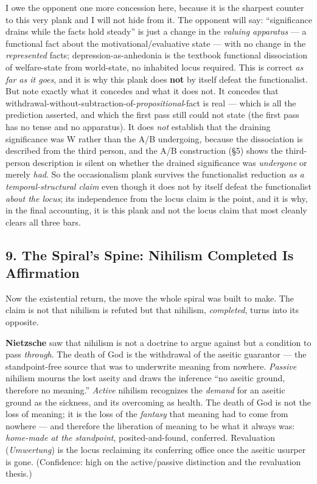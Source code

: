 \documentclass[11pt]{article}
\begin{document}
I owe the opponent one more concession here, because it is the sharpest counter to this very plank and I will not hide from it. The opponent will say: ``significance drains while the facts hold steady'' is just a change in the \emph{valuing apparatus} — a functional fact about the motivational/\allowbreak{}evaluative state — with no change in the \emph{represented} facts; depression-as-anhedonia is the textbook functional dissociation of welfare-state from world-state, no inhabited locus required. This is correct \emph{as far as it goes}, and it is why this plank does \textbf{not} by itself defeat the functionalist. But note exactly what it concedes and what it does not. It concedes that withdrawal-without-subtraction-of-\emph{propositional}-fact is real — which is all the prediction asserted, and which the first pass still could not state (the first pass has no tense and no apparatus). It does \emph{not} establish that the draining significance was W rather than the A/\allowbreak{}B undergoing, because the dissociation is described from the third person, and the A/\allowbreak{}B construction (§5) shows the third-person description is silent on whether the drained significance was \emph{undergone} or merely \emph{had}. So the occasionalism plank survives the functionalist reduction \emph{as a temporal-structural claim} even though it does not by itself defeat the functionalist \emph{about the locus}; its independence from the locus claim is the point, and it is why, in the final accounting, it is this plank and not the locus claim that most cleanly clears all three bars.

\subsection*{9. The Spiral's Spine: Nihilism Completed Is Affirmation}

Now the existential return, the move the whole spiral was built to make. The claim is not that nihilism is refuted but that nihilism, \emph{completed}, turns into its opposite.

\textbf{Nietzsche} saw that nihilism is not a doctrine to argue against but a condition to pass \emph{through}. The death of God is the withdrawal of the aseitic guarantor — the standpoint-free source that was to underwrite meaning from nowhere. \emph{Passive} nihilism mourns the lost aseity and draws the inference ``no aseitic ground, therefore no meaning.'' \emph{Active} nihilism recognizes the \emph{demand} for an aseitic ground as the sickness, and its overcoming as health. The death of God is not the loss of meaning; it is the loss of the \emph{fantasy} that meaning had to come from nowhere — and therefore the liberation of meaning to be what it always was: \emph{home-made at the standpoint}, posited-and-found, conferred. Revaluation (\emph{Umwertung}) is the locus reclaiming its conferring office once the aseitic usurper is gone. (Confidence: high on the active/\allowbreak{}passive distinction and the revaluation thesis.)
\end{document}
